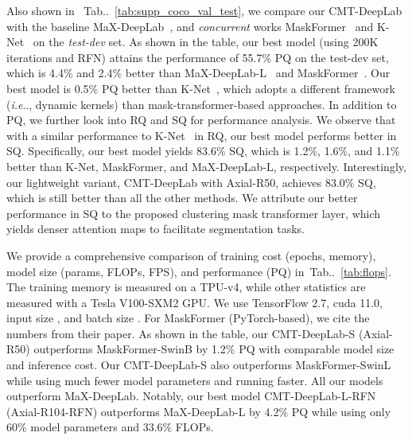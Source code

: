 \documentclass[10pt,twocolumn,letterpaper]{article}
\makeatletter
\DeclareRobustCommand\onedot{\futurelet\@let@token\@onedot}
\def\@onedot{\ifx\@let@token.\else.\null\fi\xspace}
\def\ie{\emph{i.e}\onedot} \def\Ie{\emph{I.e}\onedot}
\newcommand{\tabref}[1]{Tab\onedot~\ref{#1}}
\makeatother
\begin{document}
Also shown in ~\tabref{tab:supp_coco_val_test}, we compare our CMT-DeepLab with the baseline MaX-DeepLab~\cite{wang2021max}, and {\it concurrent} works MaskFormer~\cite{cheng2021per} and K-Net~\cite{zhang2021k} on the {\it test-dev} set.
As shown in the table, our best model (using 200K iterations and RFN) attains the performance of 55.7\% PQ on the test-dev set, which is 4.4\% and 2.4\% better than MaX-DeepLab-L~\cite{wang2021max} and MaskFormer~\cite{cheng2021per}. Our best model is 0.5\% PQ better than K-Net~\cite{zhang2021k}, which adopts a different framework (\ie, dynamic kernels) than mask-transformer-based approaches.
In addition to PQ, we further look into RQ and SQ for performance analysis. We observe that with a similar performance to K-Net~\cite{zhang2021k} in RQ, our best model performs better in SQ. Specifically, our best model yields 83.6\% SQ, which is 1.2\%, 1.6\%, and 1.1\% better than K-Net, MaskFormer, and MaX-DeepLab-L, respectively. Interestingly, our lightweight variant, CMT-DeepLab with Axial-R50, achieves 83.0\% SQ, which is still better than all the other methods. We attribute our better performance in SQ to the proposed clustering mask transformer layer, which yields denser attention maps to facilitate segmentation tasks.

We provide a comprehensive comparison of training cost (epochs, memory), model size (params, FLOPs, FPS), and performance (PQ) in~\tabref{tab:flops}.
The training memory is measured on a TPU-v4, while other statistics are measured with a Tesla V100-SXM2 GPU. We use TensorFlow 2.7, cuda 11.0, input size , and batch size .
For MaskFormer (PyTorch-based), we cite the numbers from their paper.
As shown in the table, our CMT-DeepLab-S (Axial-R50) outperforms MaskFormer-SwinB by 1.2\% PQ with comparable model size and inference cost. Our CMT-DeepLab-S also outperforms MaskFormer-SwinL while using much fewer model parameters and running faster. All our models outperform MaX-DeepLab. Notably, our best model CMT-DeepLab-L-RFN (Axial-R104-RFN) outperforms MaX-DeepLab-L by 4.2\% PQ while using only 60\% model parameters and 33.6\% FLOPs.
\end{document}
